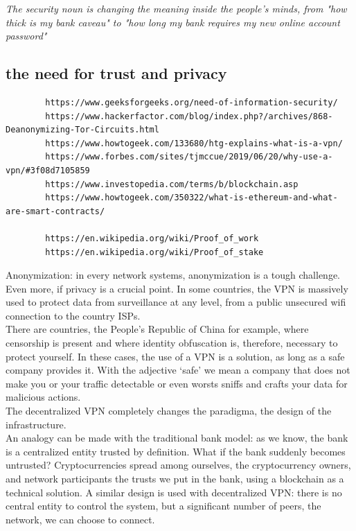 \documentclass[]{article}
\begin{document}
	\textit{The security noun is changing the meaning inside the people's minds, from "how thick is my bank caveau" to "how long my bank requires my new online account password"}

	\subsection{the need for trust and privacy}

	\begin{verbatim}
		https://www.geeksforgeeks.org/need-of-information-security/
		https://www.hackerfactor.com/blog/index.php?/archives/868-Deanonymizing-Tor-Circuits.html
		https://www.howtogeek.com/133680/htg-explains-what-is-a-vpn/
		https://www.forbes.com/sites/tjmccue/2019/06/20/why-use-a-vpn/#3f08d7105859
		https://www.investopedia.com/terms/b/blockchain.asp
		https://www.howtogeek.com/350322/what-is-ethereum-and-what-are-smart-contracts/
		
		https://en.wikipedia.org/wiki/Proof_of_work
		https://en.wikipedia.org/wiki/Proof_of_stake
	\end{verbatim}
	
	Anonymization: in every network systems, anonymization is a tough challenge. Even more, if privacy is a crucial point. In some countries, the VPN is massively used to protect data from surveillance at any level, from a public unsecured wifi connection to the country ISPs.\\There are countries, the People's Republic of China for example, where censorship is present and where identity obfuscation is, therefore, necessary to protect yourself. In these cases, the use of a VPN is a solution, as long as a safe company provides it. With the adjective `safe' we mean a company that does not make you or your traffic detectable or even worsts sniffs and crafts your data for malicious actions.\\

	The decentralized VPN completely changes the paradigma, the design of the infrastructure.\\
	An analogy can be made with the traditional bank model: as we know, the bank is a centralized entity trusted by definition. What if the bank suddenly becomes untrusted? Cryptocurrencies spread among ourselves, the cryptocurrency owners, and network participants the trusts we put in the bank, using a blockchain as a technical solution. 
	A similar design is used with decentralized VPN: there is no central entity to control the system, but a significant number of peers, the network, we can choose to connect.
\end{document}
